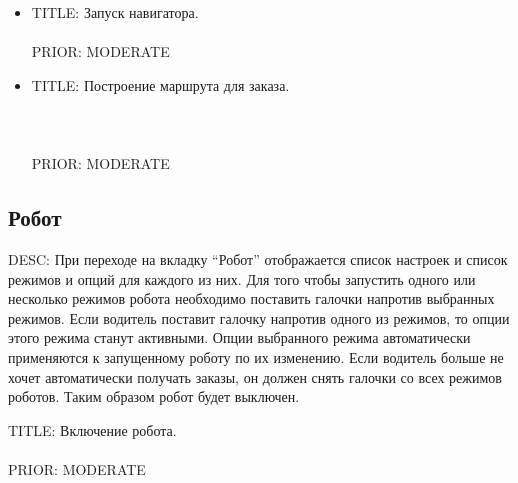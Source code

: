       \begin{itemize}
        \item 
        {TITLE: Запуск навигатора.\\
        \\
        PRIOR: MODERATE\\}

        \item{
        TITLE: Построение маршрута для заказа.\\
        \\
        \\
        \\
        PRIOR: MODERATE\\}
      \end{itemize}

  \subsection{Робот}

    DESC: При переходе на вкладку “Робот” отображается список настроек и список режимов и опций для каждого из них. Для того чтобы запустить одного или несколько режимов робота необходимо поставить галочки напротив выбранных режимов. Если водитель поставит галочку напротив одного из режимов, то опции этого режима станут активными. Опции выбранного режима автоматически применяются к запущенному роботу по их изменению. Если водитель больше не хочет автоматически получать заказы, он должен снять галочки со всех режимов роботов. Таким образом робот будет выключен.

      TITLE: Включение робота.\\
      \\
      PRIOR: MODERATE\\


